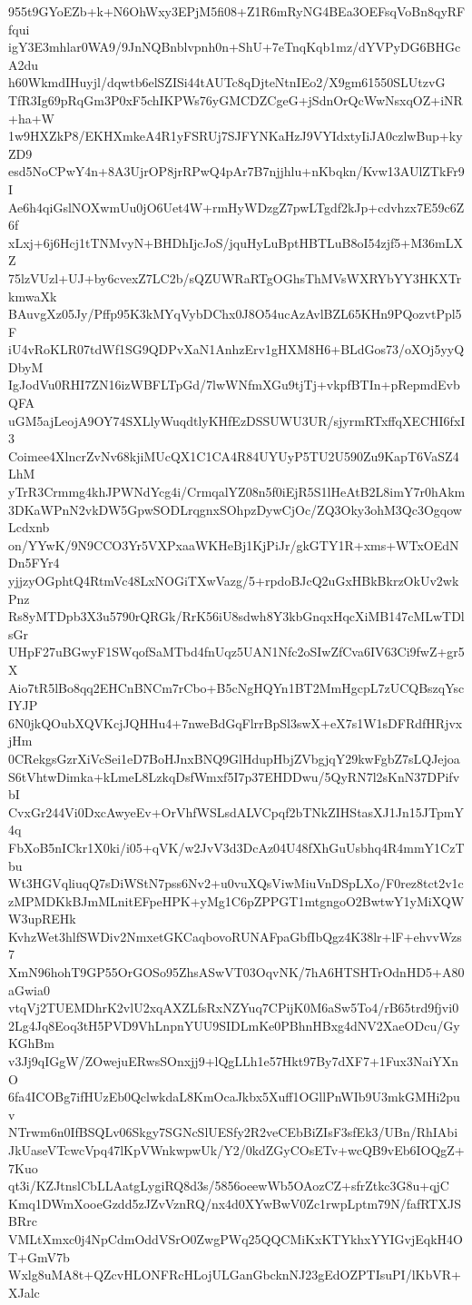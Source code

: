 955t9GYoEZb+k+N6OhWxy3EPjM5fi08+Z1R6mRyNG4BEa3OEFsqVoBn8qyRFfqui
igY3E3mhlar0WA9/9JnNQBnblvpnh0n+ShU+7eTnqKqb1mz/dYVPyDG6BHGcA2du
h60WkmdIHuyjl/dqwtb6elSZISi44tAUTc8qDjteNtnIEo2/X9gm61550SLUtzvG
TfR3Ig69pRqGm3P0xF5chIKPWs76yGMCDZCgeG+jSdnOrQcWwNsxqOZ+iNR+ha+W
1w9HXZkP8/EKHXmkeA4R1yFSRUj7SJFYNKaHzJ9VYIdxtyIiJA0czlwBup+kyZD9
esd5NoCPwY4n+8A3UjrOP8jrRPwQ4pAr7B7njjhlu+nKbqkn/Kvw13AUlZTkFr9I
Ae6h4qiGslNOXwmUu0jO6Uet4W+rmHyWDzgZ7pwLTgdf2kJp+cdvhzx7E59c6Z6f
xLxj+6j6Hcj1tTNMvyN+BHDhIjcJoS/jquHyLuBptHBTLuB8oI54zjf5+M36mLXZ
75lzVUzl+UJ+by6cvexZ7LC2b/sQZUWRaRTgOGhsThMVsWXRYbYY3HKXTrkmwaXk
BAuvgXz05Jy/Pffp95K3kMYqVybDChx0J8O54ucAzAvlBZL65KHn9PQozvtPpl5F
iU4vRoKLR07tdWf1SG9QDPvXaN1AnhzErv1gHXM8H6+BLdGos73/oXOj5yyQDbyM
IgJodVu0RHI7ZN16izWBFLTpGd/7lwWNfmXGu9tjTj+vkpfBTIn+pRepmdEvbQFA
uGM5ajLeojA9OY74SXLlyWuqdtlyKHfEzDSSUWU3UR/sjyrmRTxffqXECHI6fxI3
Coimee4XlncrZvNv68kjiMUcQX1C1CA4R84UYUyP5TU2U590Zu9KapT6VaSZ4LhM
yTrR3Crmmg4khJPWNdYcg4i/CrmqalYZ08n5f0iEjR5S1lHeAtB2L8imY7r0hAkm
3DKaWPnN2vkDW5GpwSODLrqgnxSOhpzDywCjOc/ZQ3Oky3ohM3Qc3OgqowLcdxnb
on/YYwK/9N9CCO3Yr5VXPxaaWKHeBj1KjPiJr/gkGTY1R+xms+WTxOEdNDn5FYr4
yjjzyOGphtQ4RtmVc48LxNOGiTXwVazg/5+rpdoBJcQ2uGxHBkBkrzOkUv2wkPnz
Rs8yMTDpb3X3u5790rQRGk/RrK56iU8sdwh8Y3kbGnqxHqcXiMB147cMLwTDlsGr
UHpF27uBGwyF1SWqofSaMTbd4fnUqz5UAN1Nfc2oSIwZfCva6IV63Ci9fwZ+gr5X
Aio7tR5lBo8qq2EHCnBNCm7rCbo+B5cNgHQYn1BT2MmHgcpL7zUCQBszqYscIYJP
6N0jkQOubXQVKcjJQHHu4+7nweBdGqFlrrBpSl3swX+eX7s1W1sDFRdfHRjvxjHm
0CRekgsGzrXiVcSei1eD7BoHJnxBNQ9GlHdupHbjZVbgjqY29kwFgbZ7sLQJejoa
S6tVhtwDimka+kLmeL8LzkqDsfWmxf5I7p37EHDDwu/5QyRN7l2sKnN37DPifvbI
CvxGr244Vi0DxcAwyeEv+OrVhfWSLsdALVCpqf2bTNkZIHStasXJ1Jn15JTpmY4q
FbXoB5nICkr1X0ki/i05+qVK/w2JvV3d3DcAz04U48fXhGuUsbhq4R4mmY1CzTbu
Wt3HGVqliuqQ7sDiWStN7pss6Nv2+u0vuXQsViwMiuVnDSpLXo/F0rez8tct2v1c
zMPMDKkBJmMLnitEFpeHPK+yMg1C6pZPPGT1mtgngoO2BwtwY1yMiXQWW3upREHk
KvhzWet3hlfSWDiv2NmxetGKCaqbovoRUNAFpaGbfIbQgz4K38lr+lF+ehvvWzs7
XmN96hohT9GP55OrGOSo95ZhsASwVT03OqvNK/7hA6HTSHTrOdnHD5+A80aGwia0
vtqVj2TUEMDhrK2vlU2xqAXZLfsRxNZYuq7CPijK0M6aSw5To4/rB65trd9fjvi0
2Lg4Jq8Eoq3tH5PVD9VhLnpnYUU9SIDLmKe0PBhnHBxg4dNV2XaeODcu/GyKGhBm
v3Jj9qIGgW/ZOwejuERwsSOnxjj9+lQgLLh1e57Hkt97By7dXF7+1Fux3NaiYXnO
6fa4ICOBg7ifHUzEb0QclwkdaL8KmOcaJkbx5Xuff1OGllPnWIb9U3mkGMHi2puv
NTrwm6n0IfBSQLv06Skgy7SGNcSlUESfy2R2veCEbBiZIsF3sfEk3/UBn/RhIAbi
JkUaseVTcwcVpq47lKpVWnkwpwUk/Y2/0kdZGyCOsETv+wcQB9vEb6IOQgZ+7Kuo
qt3i/KZJtnslCbLLAatgLygiRQ8d3s/5856oeewWb5OAozCZ+sfrZtkc3G8u+qjC
Kmq1DWmXooeGzdd5zJZvVznRQ/nx4d0XYwBwV0Zc1rwpLptm79N/fafRTXJSBRrc
VMLtXmxc0j4NpCdmOddVSrO0ZwgPWq25QQCMiKxKTYkhxYYIGvjEqkH4OT+GmV7b
Wxlg8uMA8t+QZcvHLONFRcHLojULGanGbcknNJ23gEdOZPTIsuPI/lKbVR+XJalc
